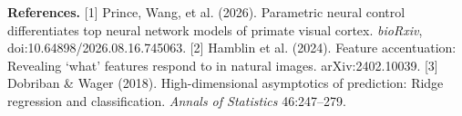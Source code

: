 \documentclass[12pt,a4paper]{article}
\begin{document}
\vspace{2pt}
{\fontsize{10}{11}\selectfont
\textbf{References.}
[1] Prince, Wang, et al. (2026). Parametric neural control differentiates top neural network models of primate visual cortex. \emph{bioRxiv}, doi:10.64898/2026.08.16.745063.
[2] Hamblin et al. (2024). Feature accentuation: Revealing `what' features respond to in natural images. arXiv:2402.10039.
[3] Dobriban \& Wager (2018). High-dimensional asymptotics of prediction: Ridge regression and classification. \emph{Annals of Statistics} 46:247--279.
\par}
\end{document}
